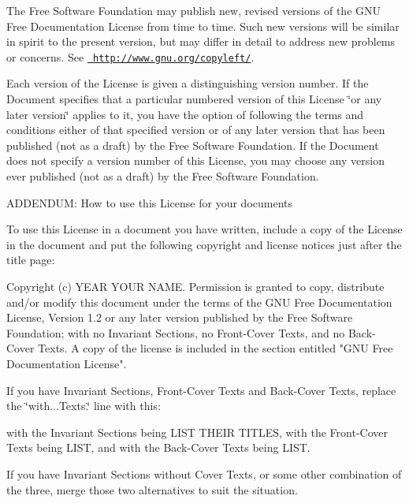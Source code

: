 The Free Software Foundation may publish new, revised versions of the G\+NU Free Documentation License from time to time. Such new versions will be similar in spirit to the present version, but may differ in detail to address new problems or concerns. See \href{http://www.gnu.org/copyleft/}{\texttt{ http\+://www.\+gnu.\+org/copyleft/}}.

Each version of the License is given a distinguishing version number. If the Document specifies that a particular numbered version of this License \char`\"{}or any later version\char`\"{} applies to it, you have the option of following the terms and conditions either of that specified version or of any later version that has been published (not as a draft) by the Free Software Foundation. If the Document does not specify a version number of this License, you may choose any version ever published (not as a draft) by the Free Software Foundation.

A\+D\+D\+E\+N\+D\+UM\+: How to use this License for your documents

To use this License in a document you have written, include a copy of the License in the document and put the following copyright and license notices just after the title page\+: \begin{DoxyVerb}Copyright (c)  YEAR  YOUR NAME.
Permission is granted to copy, distribute and/or modify this document
under the terms of the GNU Free Documentation License, Version 1.2
or any later version published by the Free Software Foundation;
with no Invariant Sections, no Front-Cover Texts, and no Back-Cover Texts.
A copy of the license is included in the section entitled "GNU
Free Documentation License".
\end{DoxyVerb}


If you have Invariant Sections, Front-\/\+Cover Texts and Back-\/\+Cover Texts, replace the \char`\"{}with...\+Texts.\char`\"{} line with this\+: \begin{DoxyVerb}with the Invariant Sections being LIST THEIR TITLES, with the
Front-Cover Texts being LIST, and with the Back-Cover Texts being LIST.
\end{DoxyVerb}


If you have Invariant Sections without Cover Texts, or some other combination of the three, merge those two alternatives to suit the situation.

